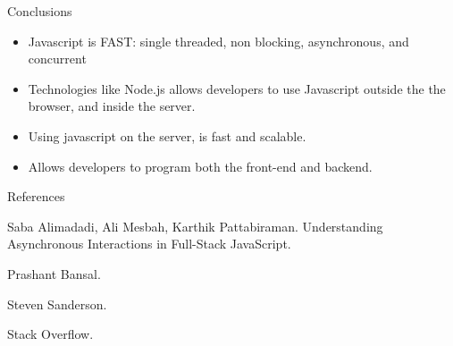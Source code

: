 \documentclass{beamer}
\begin{document}
\begin{frame}{Conclusions}{}
	\begin{itemize}
		\item Javascript is FAST: single threaded, non blocking, asynchronous, and concurrent
		\vspace{2em}
		\item Technologies like Node.js allows developers to use Javascript outside the
		the browser, and inside the server.
		\vspace{2em}
		\item Using javascript on the server, is fast and scalable.
		\vspace{2em}
		\item Allows developers to program both the front-end and backend.
	\end{itemize}
\end{frame}


\begin{frame}{References}

  	\begin{thebibliography}{10}

    	Saba Alimadadi, Ali Mesbah, Karthik Pattabiraman.
    	\newblock  Understanding Asynchronous Interactions in Full-Stack JavaScript.


  		Prashant Bansal.


    	Steven Sanderson.


	Stack Overflow.

  \end{thebibliography}
\end{frame}
\end{document}
